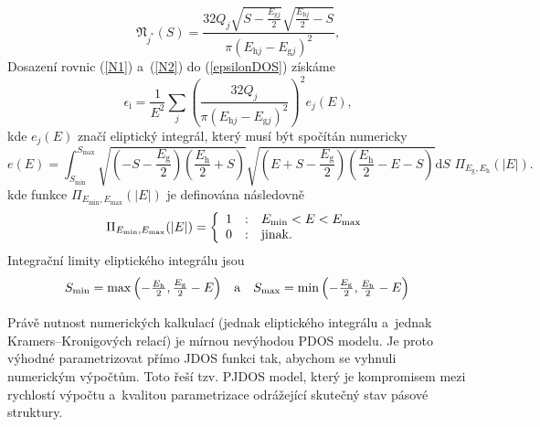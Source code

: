 \begin{equation}
\label{N2}
\mathfrak{N}_{j^*}(S) = 
\frac{
		32Q_j 
		\sqrt{S-\frac{E_{\mathrm{g}j}}{2}}
		\sqrt{\frac{E_{\mathrm{h}j}}{2}-S}
	}{
		\pi (E_{\mathrm{h}j} - E_{\mathrm{g}j})^2
	}
\text{,}
\end{equation}
Dosazení rovnic (\ref{N1}) a~(\ref{N2}) do (\ref{epsilonDOS}) získáme
\begin{equation}
\epsilon_\mathrm{i} = \frac{1}{E^2} \sum_j \left(\frac{32Q_j}{\pi (E_{\mathrm{h}j} - E_{\mathrm{g}j})^2}\right)^2 e_j(E) \text{,}
\end{equation}
kde $e_j(E)$ značí eliptický integrál, který musí být spočítán numericky
\begin{equation}
e(E) = \int_{S_\mathrm{min}}^{S_\mathrm{max}}
\sqrt{\left(-S - \frac{E_\mathrm{g}}{2}\right)\left(\frac{E_\mathrm{h}}{2} + S\right)}
\sqrt{\left(E + S - \frac{E_\mathrm{g}}{2}\right)\left(\frac{E_\mathrm{h}}{2} -E - S\right)}
\mathrm{d}S\,\,\Pi_{E_{\mathrm{g}},E_{\mathrm{h}}}(|E|)\text{.}
\end{equation}
kde funkce $\Pi_{E_\mathrm{min},E_\mathrm{max}}(|E|)$ je definována následovně
\begin{equation}
\Pi_{E_\mathrm{min},E_\mathrm{max}}(|E|) = 
	\left\{\begin{array}{l c l} 
	1 & : & E_\mathrm{min} < E < E_\mathrm{max} \\
	0 & : & \text{jinak.} \end{array} \right.
\end{equation}
Integrační limity eliptického integrálu jsou 
\begin{equation}
\begin{array}{l c r}
S_\mathrm{min} = \max\left(-\frac{E_\mathrm{h}}{2}, \frac{E_\mathrm{g}}{2} -E\right) &
\text{a} &
S_\mathrm{max} = \min\left(-\frac{E_\mathrm{g}}{2}, \frac{E_\mathrm{h}}{2} -E\right) \\
\end{array}
\end{equation}



Právě nutnost numerických kalkulací (jednak eliptického integrálu a~jednak Kramers--Kronigových relací) je mírnou nevýhodou PDOS modelu. Je proto výhodné parametrizovat přímo JDOS funkci tak, abychom se vyhnuli numerickým výpočtům. Toto řeší tzv. PJDOS model, který je kompromisem mezi rychlostí výpočtu a~kvalitou parametrizace odrážející skutečný stav pásové struktury. 


